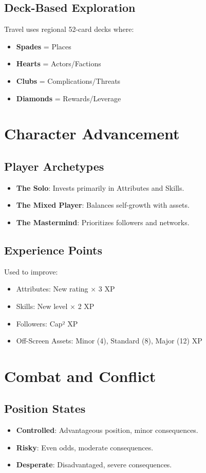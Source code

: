 \documentclass[11pt,twoside]{article}
\begin{document}
\subsection{Deck-Based Exploration}
Travel uses regional 52-card decks where:
\begin{itemize}[leftmargin=*]
    \item \textbf{Spades} = Places
    \item \textbf{Hearts} = Actors/Factions
    \item \textbf{Clubs} = Complications/Threats
    \item \textbf{Diamonds} = Rewards/Leverage
\end{itemize}

\section{Character Advancement}

\subsection{Player Archetypes}
\begin{itemize}[leftmargin=*]
    \item \textbf{The Solo}: Invests primarily in Attributes and Skills.
    \item \textbf{The Mixed Player}: Balances self-growth with assets.
    \item \textbf{The Mastermind}: Prioritizes followers and networks.
\end{itemize}

\subsection{Experience Points}
Used to improve:
\begin{itemize}[leftmargin=*]
    \item Attributes: New rating × 3 XP
    \item Skills: New level × 2 XP
    \item Followers: Cap² XP
    \item Off-Screen Assets: Minor (4), Standard (8), Major (12) XP
\end{itemize}

\section{Combat and Conflict}

\subsection{Position States}
\begin{itemize}[leftmargin=*]
    \item \textbf{Controlled}: Advantageous position, minor consequences.
    \item \textbf{Risky}: Even odds, moderate consequences.
    \item \textbf{Desperate}: Disadvantaged, severe consequences.
\end{itemize}
\end{document}
